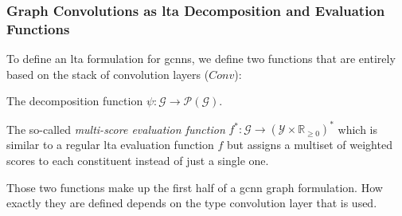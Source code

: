 \subsubsection{Graph Convolutions as \ac*{lta} Decomposition and Evaluation Functions}

To define an \ac{lta} formulation for \acp{gcnn}, we define two functions that are entirely based on the stack of convolution layers ($\mathit{Conv}$):
\begin{enumerate*}
	\item The decomposition function $\psi: \mathcal{G} \to \mathcal{P}(\mathcal{G})$.
	\item The so-called \textit{multi-score evaluation function} $f^{*}: \mathcal{G} \to {(\mathcal{Y} \times \mathbb{R}_{\geq 0})}^{*}$ which is similar to a regular \ac{lta} evaluation function $f$ but assigns a multiset of weighted scores to each constituent instead of just a single one.
\end{enumerate*}
Those two functions make up the first half of a \ac{gcnn} graph formulation.
How exactly they are defined depends on the type convolution layer that is used.

